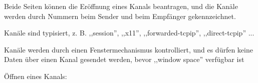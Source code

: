\documentclass[a4paper]{article}
\begin{document}
\begin{multicols}{3}
\begin{itemize*}
\begin{itemize*}
                  \begin{itemize*}
                        \item Beide Seiten können die Eröffnung eines Kanals beantragen, und die Kanäle werden durch Nummern beim Sender und beim Empfänger gekennzeichnet.
                        \item Kanäle sind typisiert, z. B. ,,session'', ,,x11'', ,,forwarded-tcpip'', ,,direct-tcpip'' ...
                        \item Kanäle werden durch einen Fenstermechanismus kontrolliert, und es dürfen keine Daten über einen Kanal gesendet werden, bevor ,,window space'' verfügbar ist
                  \end{itemize*}
                  \item
                  Öffnen eines Kanals:


\end{itemize*}
\end{itemize*}
\end{multicols}
\end{document}
